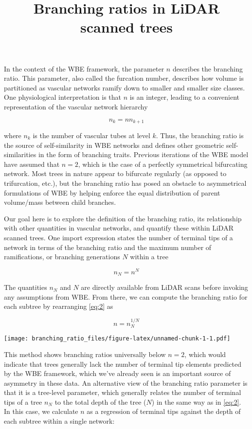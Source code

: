 \documentclass[]{article}
\title{Branching ratios in LiDAR scanned trees}
\author{}
\date{\vspace{-2.5em}}
\begin{document}
\maketitle

In the context of the WBE framework, the parameter \(n\) describes the
branching ratio. This parameter, also called the furcation number,
describes how volume is partitioned as vascular networks ramify down to
smaller and smaller size classes. One physiological interpretation is
that \(n\) is an integer, leading to a convenient representation of the
vascular network hierarchy

\begin{equation}
n_{k} = nn_{k+1} 
\end{equation}

where \(n_{k}\) is the number of vascular tubes at level \(k\). Thus,
the branching ratio is the source of self-similarity in WBE networks and
defines other geometric self-similarities in the form of branching
traits. Previous iterations of the WBE model have assumed that
\(n = 2\), which is the case of a perfectly symmetrical bifurcating
network. Most trees in nature appear to bifurcate regularly (as opposed
to trifurcation, etc.), but the branching ratio has posed an obstacle to
asymmetrical formulations of WBE by helping enforce the equal
distribution of parent volume/mass between child branches.

Our goal here is to explore the definition of the branching ratio, its
relationship with other quantities in vascular networks, and quantify
these within LiDAR scanned trees. One import expression states the
number of terminal tips of a network in terms of the branching ratio and
the maximum number of ramifications, or branching generations \(N\)
within a tree

\begin{equation} \label{eq:2}  
n_{N} = n^{N}
\end{equation}

The quantities \(n_{N}\) and \(N\) are directly available from LiDAR
scans before invoking any assumptions from WBE. From there, we can
compute the branching ratio for each subtree by rearranging \ref{eq:2}
as

\begin{equation} 
n = n_{N}^{1/N}
\end{equation}

\texttt{[image: branching\_ratio\_files/figure-latex/unnamed-chunk-1-1.pdf]}

This method shows branching ratios universally below \(n=2\), which
would indicate that trees generally lack the number of terminal tip
elements predicted by the WBE framework, which we've already seen is an
important source of asymmetry in these data. An alternative view of the
branching ratio parameter is that it is a tree-level parameter, which
generally relates the number of terminal tips of a tree \(n_{N}\) to the
total depth of the tree (\(N\)) in the same way as in \ref{eq:2}. In
this case, we calculate \(n\) as a regression of terminal tips against
the depth of each subtree within a single network:
\end{document}
